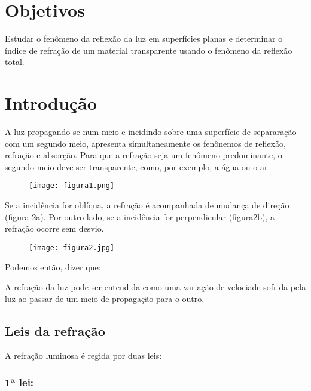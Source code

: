 \documentclass [a4paper, 12pt]{article}
\title{\sc{\textbf{Reflexão interna total e reflexão em espelhos planos}}}
\author{\textit{João Pedro Silva dos Santos}}
\date{\empty}
\begin{document}
\maketitle



\section{Objetivos}

Estudar o fenômeno da reflexão da luz em superfícies planas e determinar o índice de refração de um material transparente usando o fenômeno da reflexão total.

\section{Introdução}

A luz propagando-se num meio e incidindo sobre uma superfície de separaração com um segundo meio, apresenta simultaneamente os fenônemos de reflexão, refração e absorção. Para que a refração seja um fenômeno predominante, o segundo meio deve ser transparente, como, por exemplo, a água ou o ar.

\begin{figure}[!h]
\centering
{\texttt{[image: figura1.png]}}
\caption{\label{fig:figura1} \empty}
\end{figure}

Se a incidência for oblíqua, a refração é acompanhada de mudança de direção (figura 2a). Por outro lado, se a incidência for perpendicular (figura2b), a refração ocorre sem desvio.

\begin{figure}[!h]
\centering
{\texttt{[image: figura2.jpg]}}
\caption{\label{fig:figura2} \empty}
\end{figure}

Podemos então, dizer que:

A refração da luz pode ser entendida como uma variação de velociade sofrida pela luz ao passar de um meio de propagação para o outro.

\subsection{Leis da refração}

A refração luminosa é regida por duas leis:

\subsubsection{1ª lei:}
\end{document}
